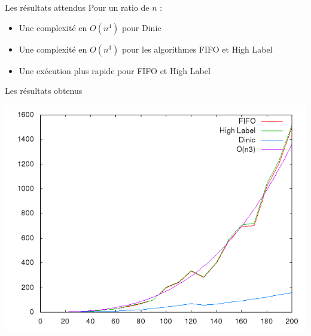 \documentclass[hyperref={},
xcolor={dvipsnames,svgnames,table},10pt]{beamer}
\begin{document}
\begin{frame}{Les résultats attendus}
	Pour un ratio de $n$ : \begin{itemize}
		\item Une complexité en $O(n^4)$ pour Dinic
		\item Une complexité en $O(n^3)$ pour les algorithmes FIFO et High Label
		\item Une exécution plus rapide pour FIFO et High Label
	\end{itemize}
\end{frame}

\begin{frame}{Les résultats obtenus}
	\begin{minipage}[c]{0.50\linewidth}
		\includegraphics[scale=0.3]{img/resultat.png}
	\end{minipage}\hfill
	\begin{minipage}[c]{0.40\linewidth}
	\end{minipage}
\end{frame}
\end{document}
